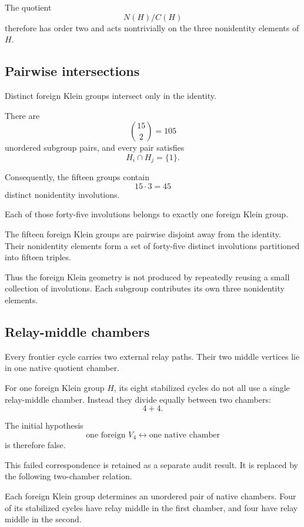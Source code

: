 The quotient
\[
N(H)/C(H)
\]
therefore has order two and acts nontrivially on the three
nonidentity elements of \(H\).

\subsection{Pairwise intersections}

Distinct foreign Klein groups intersect only in the identity.

There are
\[
\binom{15}{2}=105
\]
unordered subgroup pairs, and every pair satisfies
\[
H_i\cap H_j=\{1\}.
\]

Consequently, the fifteen groups contain
\[
15\cdot3=45
\]
distinct nonidentity involutions.

Each of those forty-five involutions belongs to exactly one foreign
Klein group.

\begin{proposition}
The fifteen foreign Klein groups are pairwise disjoint away from the
identity. Their nonidentity elements form a set of forty-five distinct
involutions partitioned into fifteen triples.
\end{proposition}

Thus the foreign Klein geometry is not produced by repeatedly reusing
a small collection of involutions. Each subgroup contributes its own
three nonidentity elements.

\subsection{Relay-middle chambers}

Every frontier cycle carries two external relay paths. Their two
middle vertices lie in one native quotient chamber.

For one foreign Klein group \(H\), its eight stabilized cycles do not
all use a single relay-middle chamber. Instead they divide equally
between two chambers:
\[
4+4.
\]

The initial hypothesis
\[
\text{one foreign }V_4
\longleftrightarrow
\text{one native chamber}
\]
is therefore false.

This failed correspondence is retained as a separate audit result. It
is replaced by the following two-chamber relation.

\begin{proposition}
Each foreign Klein group determines an unordered pair of native
chambers. Four of its stabilized cycles have relay middle in the first
chamber, and four have relay middle in the second.
\end{proposition}

